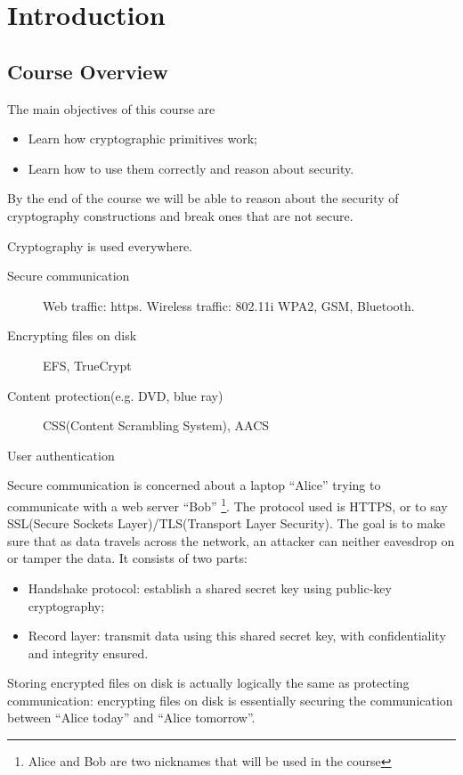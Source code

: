 \ifx\PREAMBLE\undefined


\fi
\chapter{Introduction}
\section{Course Overview}
The main objectives of this course are 
\begin{itemize}
\item Learn how cryptographic primitives work;
\item Learn how to use them correctly and reason about security.
\end{itemize}
By the end of the course we will be able to reason about the security of cryptography constructions and break ones that are not secure. 

Cryptography is used everywhere.
\begin{description}
\item[Secure communication] Web traffic: https. Wireless traffic: 802.11i WPA2, GSM, Bluetooth.
\item[Encrypting files on disk] EFS, TrueCrypt
\item[Content protection(e.g. DVD, blue ray)] CSS(Content Scrambling System), AACS
\item[User authentication]
\end{description}

Secure communication is concerned about a laptop ``Alice'' trying to communicate with a web server ``Bob''
\footnote{Alice and Bob are two nicknames that will be used in the course}. The protocol used is HTTPS, or to say SSL(Secure Sockets Layer)/TLS(Transport Layer Security). The goal is to make sure that as data travels across the network, an attacker can neither eavesdrop on or tamper the data. It consists of two parts: 
\begin{itemize}
\item Handshake protocol: establish a shared secret key using public-key cryptography;
\item Record layer: transmit data using this shared secret key, with confidentiality and integrity ensured.
\end{itemize}

Storing encrypted files on disk is actually logically the same as protecting communication: encrypting files on disk is essentially securing the communication between ``Alice today'' and ``Alice tomorrow''. 

